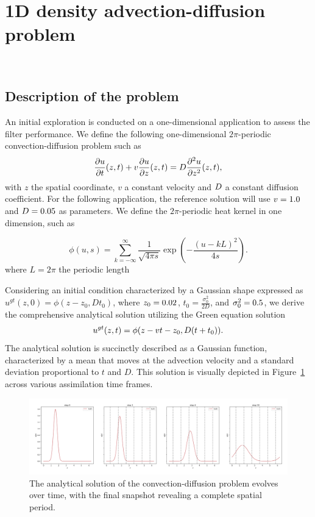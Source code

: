 \newpage

\section{1D density advection-diffusion problem}~\label{App_1D}
\subsection{Description of the problem}

An initial exploration is conducted on a one-dimensional application to assess the filter performance. We define the following one-dimensional $2\pi$-periodic convection-diffusion problem such as
\begin{equation*}
	\frac{\partial u}{\partial t}(z,t) + v \frac{\partial u}{\partial z}(z,t)  = D \frac{\partial^2 u}{\partial z^2}(z,t),
\end{equation*}
with $z$ the spatial coordinate, $v$ a constant velocity and $D$ a constant diffusion coefficient.
For the following application, the reference solution will use $v = 1.0$ and $D = 0.05$ as parameters.
We define the $2\pi$-periodic heat kernel in one dimension, such as

\begin{equation*}
	\phi(u, s) = \sum_{k=-\infty}^{\infty} \frac{1}{\sqrt{4 \pi s}} \exp{\left(-\frac{{(u - kL)}^2}{4s} \right)}.
\end{equation*}where $L=2\pi$ the periodic length

Considering an initial condition characterized by a Gaussian shape expressed as $u^{gt}(z, 0) = \phi(z-z_0, Dt_0)$, where $z_0 = 0.02$, $t_0 = \frac{\sigma_0^2}{2D}$, and $\sigma_0^2 = 0.5$, we derive the comprehensive analytical solution utilizing the Green equation solution
\begin{equation*}
	u^{gt}(z, t) = \phi(z- v t - z_0, D (t+t_0)).
\end{equation*}The analytical solution is succinctly described as a Gaussian function, characterized by a mean that moves at the advection velocity and a standard deviation proportional to $t$ and $D$. This solution is visually depicted in Figure~\ref{fig:1d_analytical} across various assimilation time frames.

\begin{figure}[ht]
	\centering
	\includegraphics[width=\linewidth]{images/app1d/analytical_solution.png}
	\caption{The analytical solution of the convection-diffusion problem evolves over time, with the final snapshot revealing a complete spatial period.}
	\label{fig:1d_analytical}
\end{figure}

